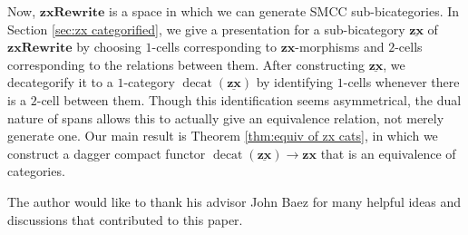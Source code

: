 \documentclass[./Catfying_zxCalc--Master.tex]{subfiles} %
\begin{document}
Now, $\mathbf{zxRewrite}$ is a space in which we can generate SMCC sub-bicategories. In Section \ref{sec:zx categorified}, we give a presentation for a sub-bicategory $\underline{\mathbf{zx}}$ of $\mathbf{zxRewrite}$ by choosing $1$-cells corresponding to $\mathbf{zx}$-morphisms and $2$-cells corresponding to the relations between them.  After constructing $\underline{\mathbf{zx}}$, we decategorify it to a $1$-category $\operatorname{decat}(\underline{\mathbf{zx}})$ by identifying $1$-cells whenever there is a $2$-cell between them.  Though this identification seems asymmetrical, the dual nature of spans allows this to actually give an equivalence relation, not merely generate one.  Our main result is Theorem \ref{thm:equiv of zx cats}, in which we construct a dagger compact functor $\operatorname{decat}(\underline{\mathbf{zx}}) \to \mathbf{zx}$ that is an equivalence of categories.  

The author would like to thank his advisor John Baez for many helpful ideas and discussions that contributed to this paper.   
 
% 
\end{document}
